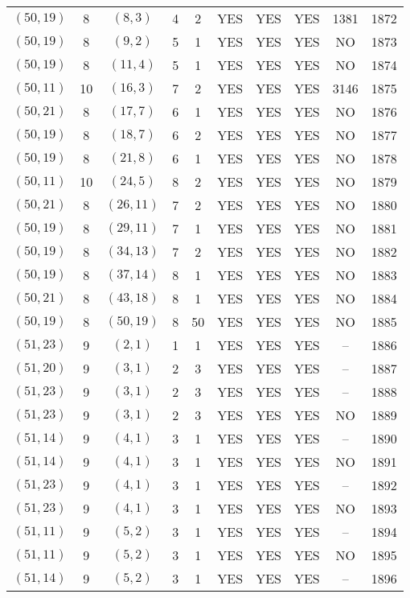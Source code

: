 \begin{longtable}{|c|c|c|c|c|c|c|c|c|c|}
$(50, 19)$ & 8 & $(8, 3)$ & 4 & 2 & YES & YES & YES & 1381 & 1872\\
$(50, 19)$ & 8 & $(9, 2)$ & 5 & 1 & YES & YES & YES & NO & 1873\\
$(50, 19)$ & 8 & $(11, 4)$ & 5 & 1 & YES & YES & YES & NO & 1874\\
$(50, 11)$ & 10 & $(16, 3)$ & 7 & 2 & YES & YES & YES & 3146 & 1875\\
$(50, 21)$ & 8 & $(17, 7)$ & 6 & 1 & YES & YES & YES & NO & 1876\\
$(50, 19)$ & 8 & $(18, 7)$ & 6 & 2 & YES & YES & YES & NO & 1877\\
$(50, 19)$ & 8 & $(21, 8)$ & 6 & 1 & YES & YES & YES & NO & 1878\\
$(50, 11)$ & 10 & $(24, 5)$ & 8 & 2 & YES & YES & YES & NO & 1879\\
$(50, 21)$ & 8 & $(26, 11)$ & 7 & 2 & YES & YES & YES & NO & 1880\\
$(50, 19)$ & 8 & $(29, 11)$ & 7 & 1 & YES & YES & YES & NO & 1881\\
$(50, 19)$ & 8 & $(34, 13)$ & 7 & 2 & YES & YES & YES & NO & 1882\\
$(50, 19)$ & 8 & $(37, 14)$ & 8 & 1 & YES & YES & YES & NO & 1883\\
$(50, 21)$ & 8 & $(43, 18)$ & 8 & 1 & YES & YES & YES & NO & 1884\\
$(50, 19)$ & 8 & $(50, 19)$ & 8 & 50 & YES & YES & YES & NO & 1885\\
$(51, 23)$ & 9 & $(2, 1)$ & 1 & 1 & YES & YES & YES & -- & 1886\\
$(51, 20)$ & 9 & $(3, 1)$ & 2 & 3 & YES & YES & YES & -- & 1887\\
$(51, 23)$ & 9 & $(3, 1)$ & 2 & 3 & YES & YES & YES & -- & 1888\\
$(51, 23)$ & 9 & $(3, 1)$ & 2 & 3 & YES & YES & YES & NO & 1889\\
$(51, 14)$ & 9 & $(4, 1)$ & 3 & 1 & YES & YES & YES & -- & 1890\\
$(51, 14)$ & 9 & $(4, 1)$ & 3 & 1 & YES & YES & YES & NO & 1891\\
$(51, 23)$ & 9 & $(4, 1)$ & 3 & 1 & YES & YES & YES & -- & 1892\\
$(51, 23)$ & 9 & $(4, 1)$ & 3 & 1 & YES & YES & YES & NO & 1893\\
$(51, 11)$ & 9 & $(5, 2)$ & 3 & 1 & YES & YES & YES & -- & 1894\\
$(51, 11)$ & 9 & $(5, 2)$ & 3 & 1 & YES & YES & YES & NO & 1895\\
$(51, 14)$ & 9 & $(5, 2)$ & 3 & 1 & YES & YES & YES & -- & 1896\\

\end{longtable}

